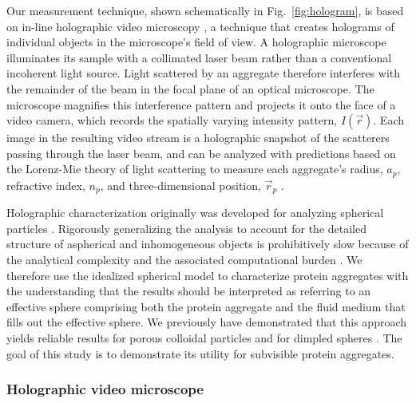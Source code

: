 Our measurement technique, shown schematically in
Fig.~\ref{fig:hologram},
is based on in-line holographic
video microscopy \cite{sheng06,lee07,lee07a}, a technique
that creates holograms of individual objects in the microscope's
field of view.
A holographic microscope illuminates
its sample with a collimated laser beam rather than
a conventional incoherent light source.
Light scattered by an aggregate therefore
interferes with the remainder of the beam in the focal
plane of an optical microscope.  The microscope
magnifies this interference pattern and projects it onto the
face of a video camera, which records the spatially varying
intensity pattern,
$I(\vec{r})$.
Each image in the resulting video stream is a holographic
snapshot of the scatterers passing through the laser beam,
and can be analyzed with predictions 
\cite{lee07a,cheong10a,krishnatreya14} based on the
Lorenz-Mie theory of light scattering 
\cite{bohren83,mishchenko02,gouesbet11}
to measure each aggregate's radius, $a_p$, refractive index, $n_p$,
and three-dimensional position, $\vec{r}_p$ \cite{lee07a}.

Holographic characterization originally was developed for 
analyzing spherical particles \cite{lee07a,cheong09}.
Rigorously generalizing the analysis to account for the
detailed structure of aspherical and inhomogeneous objects 
is prohibitively slow because of the analytical complexity
and the associated computational
burden \cite{fung11,perry12,fung12}.
We therefore use the idealized spherical model
to characterize protein aggregates
with the understanding that the results
should be interpreted as referring to an
effective sphere comprising both the protein aggregate
and the fluid medium that fills out the effective sphere.
We previously have demonstrated that this approach
yields reliable results for porous colloidal
particles \cite{cheong11} and for dimpled spheres \cite{hannel15}.
The goal of this study is to demonstrate 
its utility for subvisible protein aggregates.

\subsubsection{Holographic video microscope}

